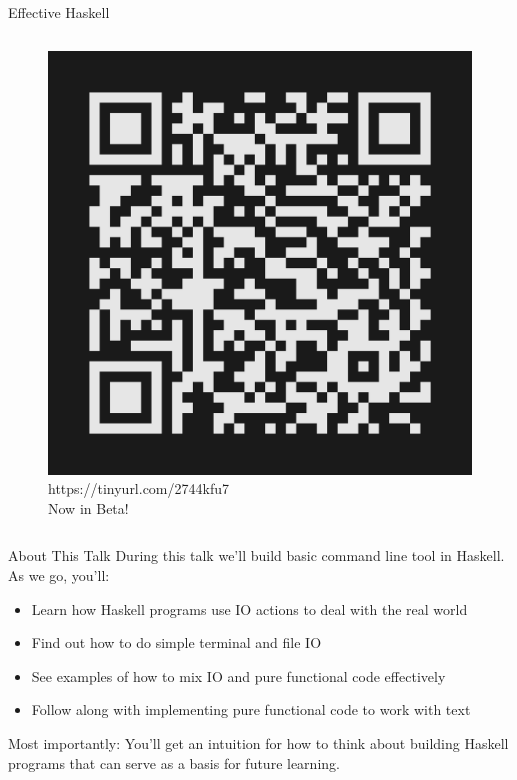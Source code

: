 \documentclass[10pt, presentation, colorlinks]{beamer}
\begin{document}
\begin{frame}[label={sec:orga3e5ded}]{Effective Haskell}
\begin{columns}
\begin{column}[t]{0.45\columnwidth}
\begin{figure}[htbp]
\centering
\includegraphics[height=\textwidth]{img/effective-haskell-url.png}
{\tiny{https://tinyurl.com/2744kfu7\\ Now in Beta!}}
\end{figure}
\end{column}
\end{columns}
\end{frame}

\begin{frame}[label={sec:orgc069d57}]{About This Talk}
During this talk we'll build basic command line tool in Haskell. As we
go, you'll:

\bigskip

\begin{itemize}
\item Learn how Haskell programs use IO actions to deal with the real world
\item Find out how to do simple terminal and file IO
\item See examples of how to mix IO and pure functional code effectively
\item Follow along with implementing pure functional code to work with text
\end{itemize}

\bigskip

\alert{Most importantly}: You'll get an intuition for how to think about
building Haskell programs that can serve as a basis for future
learning.
\end{frame}
\end{document}
